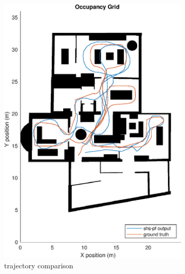 \begin{figure}[H]
	\centering
	\begin{subfigure}[t]{.45\textwidth}
		\centering
		\includegraphics[width=0.9\linewidth]{images/20201029_1603_shs-pf_trial_1_2}
		\caption{trajectory comparison}
		\label{fig:shspf_trial2_on_map}
	\end{subfigure}
	\begin{subfigure}[t]{.45\textwidth}
		\centering

\end{subfigure}
\end{figure}
